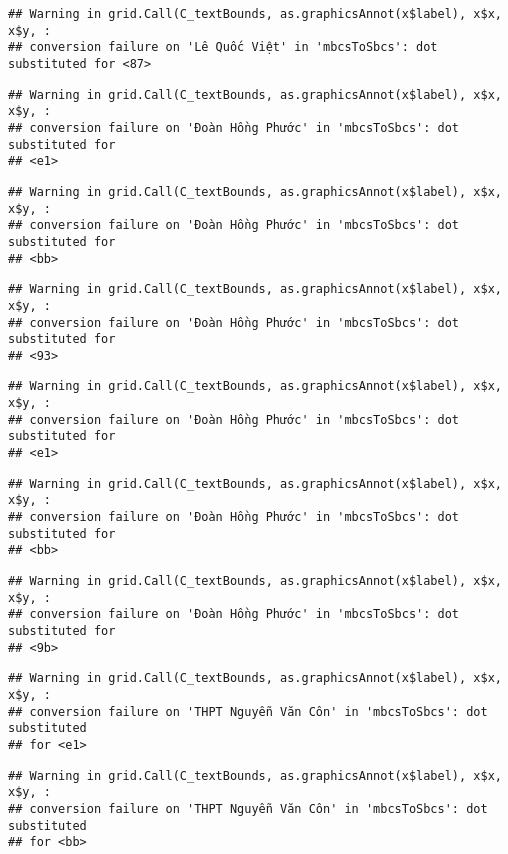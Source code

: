 \documentclass[
]{article}
\begin{document}
\begin{verbatim}
## Warning in grid.Call(C_textBounds, as.graphicsAnnot(x$label), x$x, x$y, :
## conversion failure on 'Lê Quốc Việt' in 'mbcsToSbcs': dot substituted for <87>
\end{verbatim}

\begin{verbatim}
## Warning in grid.Call(C_textBounds, as.graphicsAnnot(x$label), x$x, x$y, :
## conversion failure on 'Đoàn Hồng Phước' in 'mbcsToSbcs': dot substituted for
## <e1>
\end{verbatim}

\begin{verbatim}
## Warning in grid.Call(C_textBounds, as.graphicsAnnot(x$label), x$x, x$y, :
## conversion failure on 'Đoàn Hồng Phước' in 'mbcsToSbcs': dot substituted for
## <bb>
\end{verbatim}

\begin{verbatim}
## Warning in grid.Call(C_textBounds, as.graphicsAnnot(x$label), x$x, x$y, :
## conversion failure on 'Đoàn Hồng Phước' in 'mbcsToSbcs': dot substituted for
## <93>
\end{verbatim}

\begin{verbatim}
## Warning in grid.Call(C_textBounds, as.graphicsAnnot(x$label), x$x, x$y, :
## conversion failure on 'Đoàn Hồng Phước' in 'mbcsToSbcs': dot substituted for
## <e1>
\end{verbatim}

\begin{verbatim}
## Warning in grid.Call(C_textBounds, as.graphicsAnnot(x$label), x$x, x$y, :
## conversion failure on 'Đoàn Hồng Phước' in 'mbcsToSbcs': dot substituted for
## <bb>
\end{verbatim}

\begin{verbatim}
## Warning in grid.Call(C_textBounds, as.graphicsAnnot(x$label), x$x, x$y, :
## conversion failure on 'Đoàn Hồng Phước' in 'mbcsToSbcs': dot substituted for
## <9b>
\end{verbatim}

\begin{verbatim}
## Warning in grid.Call(C_textBounds, as.graphicsAnnot(x$label), x$x, x$y, :
## conversion failure on 'THPT Nguyễn Văn Côn' in 'mbcsToSbcs': dot substituted
## for <e1>
\end{verbatim}

\begin{verbatim}
## Warning in grid.Call(C_textBounds, as.graphicsAnnot(x$label), x$x, x$y, :
## conversion failure on 'THPT Nguyễn Văn Côn' in 'mbcsToSbcs': dot substituted
## for <bb>
\end{verbatim}
\end{document}
